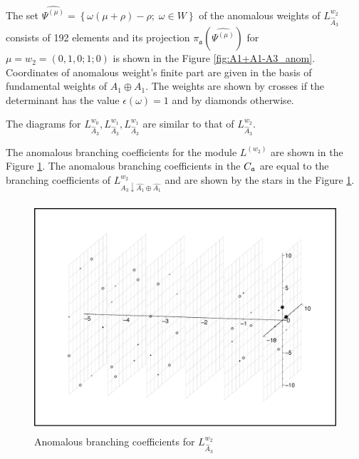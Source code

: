 \documentclass[a4paper,12pt]{article}
\theoremstyle{definition} \newtheorem{Def}{Definition}
\begin{document}
The set  $\widehat{\Psi^{(\mu)}}=\left\{\omega(\mu+\rho)-\rho;\; \omega\in W\right\}$ of the anomalous weights of $L^{w_2}_{\hat A_3}$ consists of 192 elements and its projection $\pi_{\mathfrak{a}}\left(\widehat{\Psi^{(\mu)}}\right)$ for $\mu=w_2=(0,1,0;1;0)$ is shown in the Figure \ref{fig:A1+A1-A3_anom}. Coordinates of anomalous weight's finite part are given in the basis of fundamental weights of $A_1\oplus A_1$. The weights are shown by crosses if the determinant has the value $\epsilon(\omega)=1$ and by diamonds otherwise.

The diagrams for  $L^{w_0}_{\hat A_3}, L^{w_1}_{\hat A_3}, L^{w_1}_{\hat A_3}$ are similar to that of $L^{w_2}_{\hat A_3}$.

The anomalous branching coefficients for the module $L^{(w_2)}$ are shown in the Figure  \ref{fig:A1+A1-A3_branching}. The anomalous branching coefficients in the $C_{\frak{a}}$ are equal to the branching coefficients of $L^{w_2}_{\hat A_3\downarrow \hat{A_1}\oplus\hat{A_1}}$ and are shown by the stars in the Figure \ref{fig:A1+A1-A3_branching}.
\begin{figure}[p]
  \includegraphics[width=135mm,height=85mm]{A1+A1-A3_branching.pdf}
  \caption{Anomalous branching coefficients for $L^{w_2}_{\hat A_3}$}
  \label{fig:A1+A1-A3_branching}
\end{figure}
\end{document}
